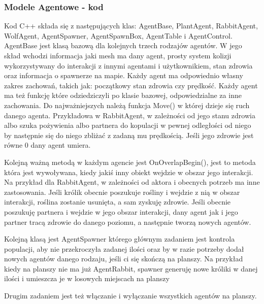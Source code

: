 \documentclass[a4paper,12pt,reqno]{article}
\begin{document}
\subsubsection{Modele Agentowe - kod}

Kod C++ składa się z następujących klas: AgentBase, PlantAgent, RabbitAgent, WolfAgent, AgentSpawner, AgentSpawnBox, AgentTable i AgentControl. 
AgentBase jest klasą bazową dla kolejnych trzech rodzajów agentów. W jego skład wchodzi informacja jaki mesh ma dany agent, prosty system kolizji wykorzystywany do interakcji z innymi agentami i użytkownikiem, stan zdrowia oraz informacja o spawnerze na mapie. Każdy agent ma odpowiednio własny zakres zachowań, takich jak: początkowy stan zdrowia czy prędkość. Każdy agent ma też funkcję które odziedziczyli po klasie bazowej, odpowiedzialne za inne zachowania. Do najważniejszych należą funkcja Move() w której dzieje się ruch danego agenta. Przykładowa w RabbitAgent, w zależności od jego stanu zdrowia albo szuka pożywienia albo partnera do kopulacji w pewnej odległości od niego by następnie się do niego zbliżać z zadaną mu prędkością. Jeśli jego zdrowie jest równe 0 dany agent umiera.



Kolejną ważną metodą w każdym agencie jest OnOverlapBegin(), jest to metoda która jest wywoływana, kiedy jakiś inny obiekt wejdzie w obszar jego interakcji. Na przykład dla RabbitAgent, w zależności od aktora i obecnych potrzeb ma inne zastosowania. Jeśli królik obecnie poszukuje rośliny i wejdzie z nią w obszar interakcji, roślina zostanie usunięta, a sam zyskuję zdrowie. Jeśli obecnie poszukuję partnera i wejdzie w jego obszar interakcji, dany agent jak i jego partner tracą zdrowie do danego poziomu, a następnie tworzą nowych agentów.
	


Kolejną klasą jest AgentSpawner którego głównym zadaniem jest kontrola populacji, aby nie przekroczyła zadanej ilości oraz by w razie potrzeby dodał nowych agentów danego rodzaju, jeśli ci się skończą na planszy. Na przykład kiedy na planszy nie ma już AgentRabbit, spawner generuję nowe króliki w danej ilości i umieszcza je w losowych miejscach na planszy


Drugim zadaniem jest też włączanie i wyłączanie wszystkich agentów na planszy.
\end{document}
